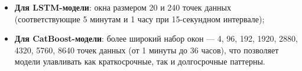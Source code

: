 \begin{itemize}
	\item \textbf{Для LSTM-модели}: окна размером 20 и 240 точек данных (соответствующие 5 минутам и 1 часу при 15-секундном интервале);
	\item \textbf{Для CatBoost-модели}: более широкий набор окон --- 4, 96, 192, 1920, 2880, 4320, 5760, 8640 точек данных (от 1 минуты до 36 часов), что позволяет модели улавливать как краткосрочные, так и долгосрочные паттерны.
\end{itemize} 